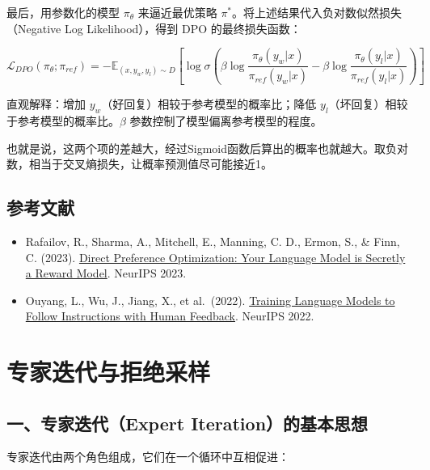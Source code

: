 最后，用参数化的模型 \(\pi_\theta\) 来逼近最优策略 \(\pi^*\)。将上述结果代入负对数似然损失（Negative Log Likelihood），得到 DPO 的最终损失函数：

\[
\mathcal{L}_{DPO}(\pi_\theta;\pi_{ref})=-\mathbb{E}_{(x,y_w,y_l)\sim D}\left[\log\sigma\left(\beta\log\frac{\pi_\theta(y_w|x)}{\pi_{ref}(y_w|x)}-\beta\log\frac{\pi_\theta(y_l|x)}{\pi_{ref}(y_l|x)}\right)\right]
\]

直观解释：增加 \(y_w\)（好回复）相较于参考模型的概率比；降低 \(y_l\)（坏回复）相较于参考模型的概率比。\(\beta\) 参数控制了模型偏离参考模型的程度。

也就是说，这两个项的差越大，经过Sigmoid函数后算出的概率也就越大。取负对数，相当于交叉熵损失，让概率预测值尽可能接近1。

\hypertarget{ux53c2ux8003ux6587ux732e-78}{%
\subsection{参考文献}\label{ux53c2ux8003ux6587ux732e-78}}

\begin{itemize}
\tightlist
\item
  Rafailov, R., Sharma, A., Mitchell, E., Manning, C. D., Ermon, S., \& Finn, C. (2023). \href{https://arxiv.org/abs/2305.18290}{Direct Preference Optimization: Your Language Model is Secretly a Reward Model}. NeurIPS 2023.
\item
  Ouyang, L., Wu, J., Jiang, X., et al.~(2022). \href{https://arxiv.org/abs/2203.02155}{Training Language Models to Follow Instructions with Human Feedback}. NeurIPS 2022.
\end{itemize}

\clearpage

\hypertarget{ux4e13ux5bb6ux8fedux4ee3ux4e0eux62d2ux7eddux91c7ux6837}{%
\section{专家迭代与拒绝采样}\label{ux4e13ux5bb6ux8fedux4ee3ux4e0eux62d2ux7eddux91c7ux6837}}

\hypertarget{ux4e00ux4e13ux5bb6ux8fedux4ee3expert-iterationux7684ux57faux672cux601dux60f3}{%
\subsection{一、专家迭代（Expert Iteration）的基本思想}\label{ux4e00ux4e13ux5bb6ux8fedux4ee3expert-iterationux7684ux57faux672cux601dux60f3}}

专家迭代由两个角色组成，它们在一个循环中互相促进：

